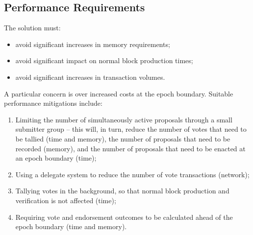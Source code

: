 \subsection{Performance Requirements}

The solution must:

\begin{itemize}
\item
  avoid significant increases in memory requirements;
\item
  avoid significant impact on normal block production times;
\item
  avoid significant increases in transaction volumes.
\end{itemize}

A particular concern is over increased costs at the epoch boundary.
%
Suitable performance mitigations include:

\begin{enumerate}
\item
  Limiting the number of simultaneously active proposals through a small submitter group
  -- this will, in turn, reduce the number of votes that need to be tallied (time and memory),  the number of proposals that need to be recorded (memory), and the number of proposals that need to be enacted at an epoch boundary (time);
\item
  Using a delegate system to reduce the number of vote transactions (network);
\item
  Tallying votes in the background, so that normal block production and verification is not affected (time);
\item
  Requiring vote and endorsement outcomes to be calculated ahead of the epoch boundary (time and memory).
\end{enumerate}
